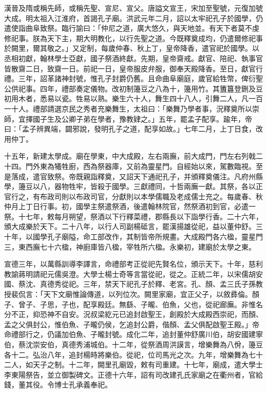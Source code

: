 漢晉及隋或稱先師，或稱先聖、宣尼、宣父。唐謚文宣王，宋加至聖號，元復加號大成。明太祖入江淮府，首謁孔子廟。洪武元年二月，詔以太牢祀孔子於國學，仍遣使詣曲阜致祭。臨行諭曰：「仲尼之道，廣大悠久，與天地並。有天下者莫不虔修祀事。朕為天下主，期大明教化，以行先聖之道。今既釋奠成均，仍遣爾修祀事於闕里，爾其敬之。」又定制，每歲仲春、秋上丁，皇帝降香，遣官祀於國學。以丞相初獻，翰林學士亞獻，國子祭酒終獻。先期，皇帝齋戒。獻官、陪祀、執事官皆散齋二日，致齋一日。前祀一日，皇帝服皮弁服，御奉天殿降香。至日，獻官行禮。三年，詔革諸神封號，惟孔子封爵仍舊。且命曲阜廟庭，歲官給牲幣，俾衍聖公供祀事。四年，禮部奏定儀物。改初制籩豆之八為十，籩用竹。其簠簋登鉶及豆初用木者，悉易以瓷。牲易以熟。樂生六十人，舞生四十八人，引舞二人，凡一百一十人。禮部請選京民之秀者充樂舞生，太祖曰：「樂舞乃學者事，況釋奠所以崇師，宜擇國子生及公卿子弟在學者，豫教肄之。」五年，罷孟子配享。踰年，帝曰：「孟子辨異端，闢邪說，發明孔子之道，配享如故。」七年二月，上丁日食，改用仲丁。

十五年，新建太學成。廟在學東，中大成殿，左右兩廡，前大成門，門左右列戟二十四。門外東為犧牲廚，西為祭器庫，又前為靈星門。自經始以來，駕數臨視。至是落成，遣官致祭。帝既親詣釋奠，又詔天下通祀孔子，并頒釋奠儀注。凡府州縣學，籩豆以八，器物牲牢，皆殺于國學。三獻禮同，十哲兩廡一獻。其祭，各以正官行之，有布政司則以布政司官，分獻則以本學儒職及老成儒士充之。每歲春、秋仲月上丁日行事。初，國學主祭遣祭酒，後遣翰林院官，然祭酒初到官，必遣一祭。十七年，敕每月朔望，祭酒以下行釋菜禮，郡縣長以下詣學行香。二十六年，頒大成樂於天下。二十八年，以行人司副楊砥言，罷漢揚雄從祀，益以董仲舒。三十年，以國學孔子廟隘，命工部改作，其制皆帝所規畫。大成殿門各六楹，靈星門三，東西廡七十六楹，神廚庫皆八楹，宰牲所六楹。永樂初，建廟於太學之東。

宣德三年，以萬縣訓導李譯言，命禮部考正從祀先賢名位，頒示天下。十年，慈利教諭蔣明請祀元儒吳澄。大學士楊士奇等言當從祀，從之。正統二年，以宋儒胡安國、蔡沈、真德秀從祀。三年，禁天下祀孔子於釋、老宮。孔、顏、孟三氏子孫教授裴侃言：「天下文廟惟論傳道，以列位次。闕里家廟，宜正父子，以敘彞倫。顏子、曾子、子思，子也，配享殿廷。無繇、子曨、伯魚，父也，從祀廊廡。非惟名分不正，抑恐神不自安。況叔梁紇元已追封啟聖王，創殿於大成殿西崇祀，而顏、孟之父俱封公，惟伯魚、子曨仍侯，乞追封公爵，偕顏、孟父俱配啟聖王殿。」帝命禮部行之，仍議加伯魚、子曨封號。成化二年，追封董仲舒廣川伯，胡安國建寧伯，蔡沈崇安伯，真德秀浦城伯。十二年，從祭酒周洪謨言，增樂舞為八佾，籩豆各十二。弘治八年，追封楊時將樂伯。從祀，位司馬光之次。九年，增樂舞為七十二人，如天子之制。十二年，闕里孔廟毀，敕有司重建。十七年，廟成，遣大學士李東陽祭告，並立御製碑文。正德十六年，詔有司改建孔氏家廟之在衢州者，官給錢，董其役。令博士孔承義奉祀。


